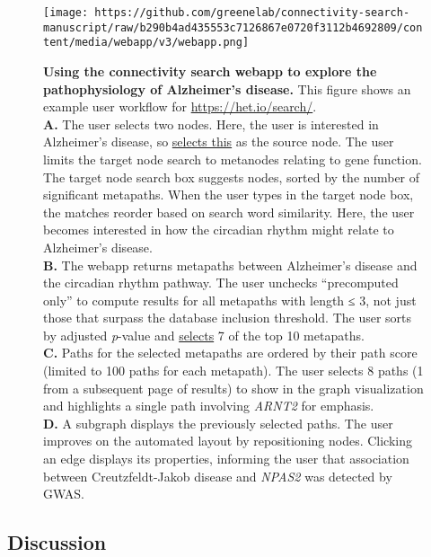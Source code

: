 \begin{figure}
\hypertarget{fig:webapp}{%
\centering
\texttt{[image: https://github.com/greenelab/connectivity-search-manuscript/raw/b290b4ad435553c7126867e0720f3112b4692809/content/media/webapp/v3/webapp.png]}
\caption{\textbf{Using the connectivity search webapp to explore the pathophysiology of Alzheimer's disease.}
This figure shows an example user workflow for \url{https://het.io/search/}.\\
\textbf{A.}
The user selects two nodes.
Here, the user is interested in Alzheimer's disease, so \href{https://het.io/search/?source=17287}{selects this} as the source node.
The user limits the target node search to metanodes relating to gene function.
The target node search box suggests nodes, sorted by the number of significant metapaths.
When the user types in the target node box, the matches reorder based on search word similarity.
Here, the user becomes interested in how the circadian rhythm might relate to Alzheimer's disease.\\
\textbf{B.}
The webapp returns metapaths between Alzheimer's disease and the circadian rhythm pathway.
The user unchecks ``precomputed only'' to compute results for all metapaths with length ≤ 3, not just those that surpass the database inclusion threshold.
The user sorts by adjusted \emph{p}-value and \href{https://het.io/search/?source=17287\&target=7607\&metapaths=DaGiGpPW\%2CDdGiGpPW\%2CDdGpPW\%2CDlAeGpPW\%2CDrDaGpPW\%2CDrDuGpPW\%2CDuGiGpPW\&complete=}{selects} 7 of the top 10 metapaths.\\
\textbf{C.}
Paths for the selected metapaths are ordered by their path score (limited to 100 paths for each metapath).
The user selects 8 paths (1 from a subsequent page of results) to show in the graph visualization and highlights a single path involving \emph{ARNT2} for emphasis.\\
\textbf{D.}
A subgraph displays the previously selected paths.
The user improves on the automated layout by repositioning nodes.
Clicking an edge displays its properties, informing the user that association between Creutzfeldt-Jakob disease and \emph{NPAS2} was detected by GWAS.
}\label{fig:webapp}
}
\end{figure}

\hypertarget{discussion}{%
\subsection{Discussion}\label{discussion}}

